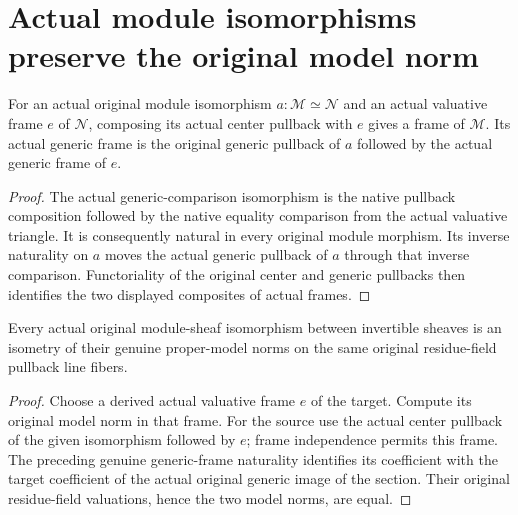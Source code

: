 \section{Actual module isomorphisms preserve the original model norm}

\begin{lemma}
\label{lem:scheme-line-actual-generic-frame-naturality}
\leanok
{}
For an actual original module isomorphism
$a:\mathcal M\simeq\mathcal N$ and an actual valuative frame $e$ of
$\mathcal N$, composing its actual center pullback with $e$ gives a
frame of $\mathcal M$. Its actual generic frame is the original
generic pullback of $a$ followed by the actual generic frame of $e$.
\end{lemma}
\begin{proof}
The actual generic-comparison isomorphism is the native pullback
composition followed by the native equality comparison from the
actual valuative triangle. It is consequently natural in every
original module morphism. Its inverse naturality on $a$ moves the
actual generic pullback of $a$ through that inverse comparison.
Functoriality of the original center and generic pullbacks then
identifies the two displayed composites of actual frames.
\end{proof}

\begin{lemma}
\label{lem:scheme-line-actual-model-isomorphism-isometry}
\leanok
{}
Every actual original module-sheaf isomorphism between invertible
sheaves is an isometry of their genuine proper-model norms on the
same original residue-field pullback line fibers.
\end{lemma}
\begin{proof}
Choose a derived actual valuative frame $e$ of the target. Compute
its original model norm in that frame. For the source use the actual
center pullback of the given isomorphism followed by $e$; frame
independence permits this frame. The preceding genuine generic-frame
naturality identifies its coefficient with the target coefficient of
the actual original generic image of the section. Their original
residue-field valuations, hence the two model norms, are equal.
\end{proof}

